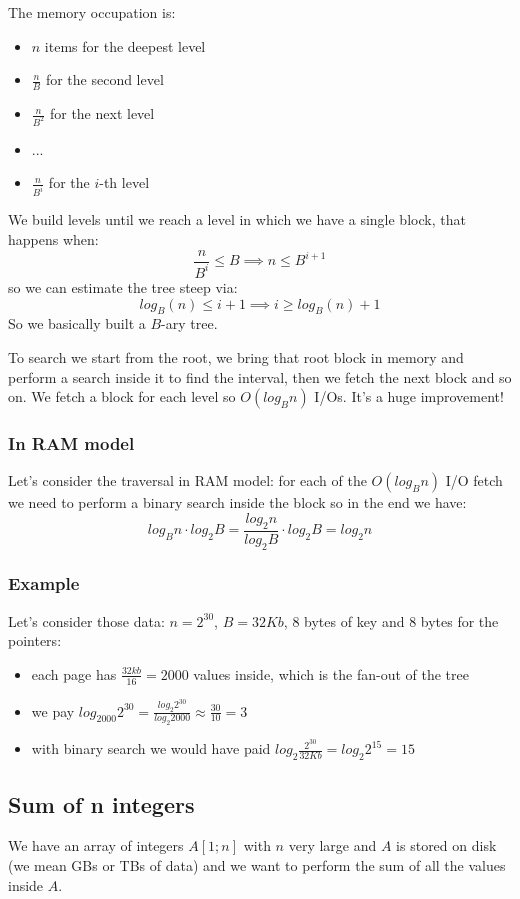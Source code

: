 The memory occupation is:
\begin{itemize}
    \item $n$ items for the deepest level
    \item $\frac{n}{B}$ for the second level
    \item $\frac{n}{B^2}$ for the next level
    \item ...
    \item $\frac{n}{B^i}$ for the $i$-th level
\end{itemize}
We build levels until we reach a level in which we have a single block, that happens when:
$$
    \frac{n}{B^i} \leq B \implies n \leq B^{i+1}
$$
so we can estimate the tree steep via:
$$
    log_B(n) \leq i+1 \implies i \geq log_B(n) + 1
$$
So we basically built a $B$-ary tree.

To search we start from the root, we bring that root block in memory and perform a search inside it to find the interval, then we fetch the next block and so on.
We fetch a block for each level so $O(log_Bn)$ I/Os.
It's a huge improvement!

\subsubsection{In RAM model}
Let's consider the traversal in RAM model: for each of the $O(log_Bn)$ I/O fetch we need to perform a binary search inside the block so in the end we have:
$$
    log_B n \cdot log_2 B = \frac{log_2 n}{log_2 B} \cdot log_2 B = log_2 n
$$

\subsubsection{Example}
Let's consider those data: $n=2^{30}$, $B=32Kb$, 8 bytes of key and 8 bytes for the pointers:
\begin{itemize}
    \item each page has $\frac{32kb}{16} = 2000$ values inside, which is the fan-out of the tree
    \item we pay $log_{2000} 2^{30} = \frac{log_2 2^{30}}{log_2 2000} \approx \frac{30}{10} = 3$
    \item with binary search we would have paid $log_2 \frac{2^{30}}{32Kb} = log_2 2^{15} = 15$
\end{itemize}

\subsection{Sum of n integers}
We have an array of integers $A[1;n]$ with $n$ very large and $A$ is stored on disk (we mean GBs or TBs of data) and we want to perform the sum of all the values inside $A$.

